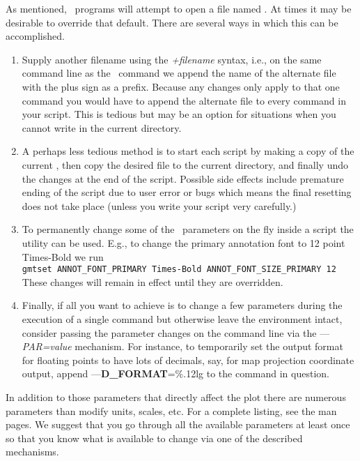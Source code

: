 As mentioned, \GMT\ programs will attempt to open a file named
.  At times it may be desirable to override
that default.  There are several ways in which this can be accomplished.
\begin{enumerate}
\item Supply another filename using the \emph{+filename} syntax, i.e.,
on the same command line as the \GMT\ command we append the name of
the alternate  file with the plus sign as a prefix.
Because any changes only apply to that one command you would have to
append the alternate file to every command in your script.  This is
tedious but may be an option for situations when you cannot write in
the current directory.
\item A perhaps less tedious method is to start each script by making a
copy of the current , then copy the desired
 file to the current directory, and finally
undo the changes at the end of the script.  Possible side effects
include premature ending of the script due to user error or bugs which
means the final resetting does not take place (unless you write your
script very carefully.)
\item To permanently change some of the \GMT\ parameters on the fly
inside a script the  utility can be used.  E.g., to
change the primary annotation font to 12 point Times-Bold we run \\

\texttt{gmtset ANNOT\_FONT\_PRIMARY Times-Bold ANNOT\_FONT\_SIZE\_PRIMARY 12} \\

These changes will remain in effect until they are overridden.
\item Finally, if all you want to achieve is to change a few parameters during
the execution of a single command but otherwise leave the environment intact, consider
passing the parameter changes on the command line via the {--}{--}\emph{PAR=value}
mechanism.  For instance, to temporarily set the output format for floating
points to have lots of decimals, say, for map projection coordinate output,
append {--}{--}{\bf D\_FORMAT}=\%.12lg to the command in question.
\end{enumerate}
In addition to those parameters
that directly affect the plot there are numerous parameters than
modify units, scales, etc.  For a complete listing, see the
 man pages.  We suggest that you go through
all the available parameters at least once so that you know what is
available to change via one of the described mechanisms.

